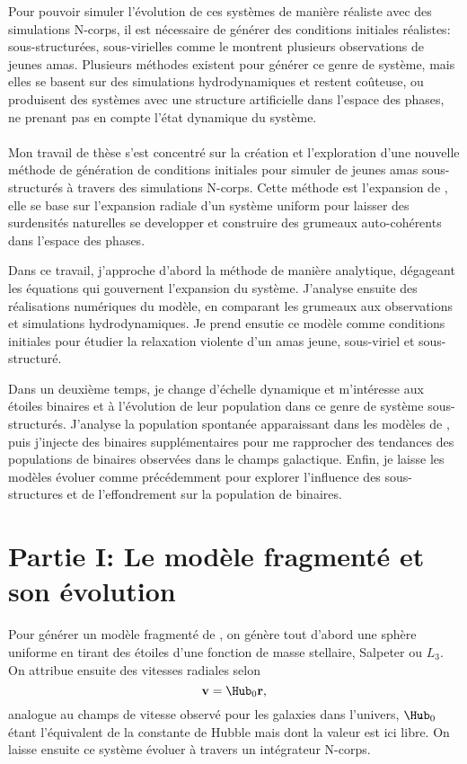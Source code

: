 Pour pouvoir simuler l'\'evolution de ces syst\`emes de mani\`ere r\'ealiste avec des simulations N-corps, il est n\'ecessaire de g\'en\'erer des conditions initiales r\'ealistes: sous-structur\'ees, sous-virielles comme le montrent plusieurs observations de jeunes amas. Plusieurs m\'ethodes existent pour g\'en\'erer ce genre de syst\`eme, mais elles se basent sur des simulations hydrodynamiques et restent coûteuse, ou produisent des syst\`emes avec une structure  artificielle dans l'espace des phases, ne prenant pas en compte l'\'etat dynamique du syst\`eme.

\paragraph*{}
Mon travail de th\`ese s'est concentr\'e sur la cr\'eation et l'exploration d'une nouvelle m\'ethode de g\'en\'eration de conditions initiales pour simuler de jeunes amas sous-structur\'es à travers des simulations N-corps. Cette m\'ethode est l'expansion de \HubLem, elle se base sur l'expansion radiale d'un syst\`eme uniform pour laisser des surdensit\'es naturelles se developper et construire des grumeaux auto-coh\'erents dans l'espace des phases.

Dans ce travail, j'approche d'abord la m\'ethode de mani\`ere analytique, d\'egageant les \'equations qui gouvernent l'expansion du syst\`eme. J'analyse ensuite des r\'ealisations num\'eriques du mod\`ele, en comparant les grumeaux aux observations et simulations hydrodynamiques. Je prend ensutie ce mod\`ele comme conditions initiales pour \'etudier la relaxation violente d'un amas jeune, sous-viriel et sous-structur\'e.

Dans un deuxi\`eme temps, je change d'\'echelle dynamique et m'int\'eresse aux \'etoiles binaires et à l'\'evolution de leur population dans ce genre de syst\`eme sous-structur\'es. J'analyse la population spontanée apparaissant dans les modèles de \HubLem, puis j'injecte des binaires supplémentaires pour me rapprocher des tendances des populations de binaires observées dans le champs galactique. Enfin, je laisse les modèles évoluer comme précédemment pour explorer l'influence des sous-structures et de l'effondrement sur la population de binaires.


\section{Partie I: Le modèle fragmenté et son évolution}


Pour générer un modèle fragmenté de \HubLem, on génère tout d'abord une sphère uniforme en tirant des étoiles d'une fonction de masse stellaire, Salpeter ou $L_3$. On attribue ensuite des vitesses radiales selon
\begin{equation}
\bold{v} = \Hub_0 \bold{r},
\end{equation}
analogue au champs de vitesse observé pour les galaxies dans l'univers, $\Hub_0$ étant l'équivalent de la constante de Hubble mais dont la valeur est ici libre. On laisse ensuite ce système évoluer à travers un intégrateur N-corps.


